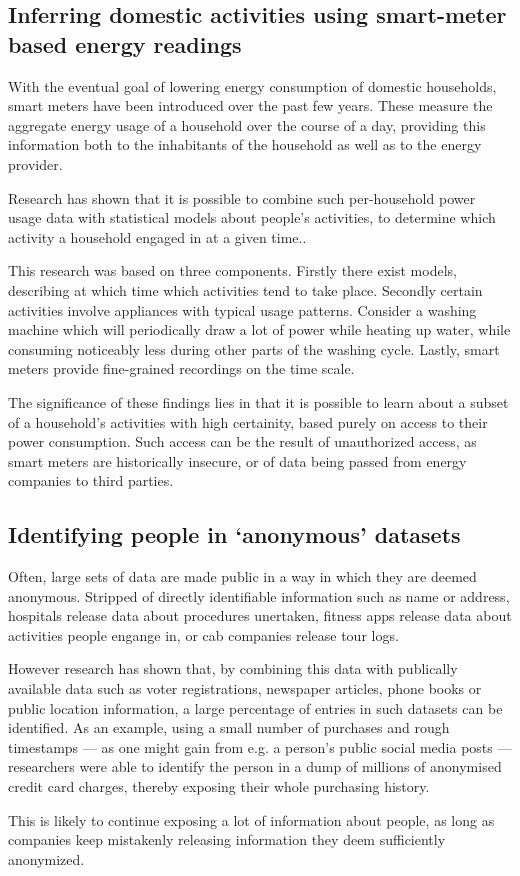 \documentclass[a4paper]{scrreprt}
\begin{document}
\subsection{Inferring domestic activities using smart-meter based energy readings}

With the eventual goal of lowering energy consumption of domestic households,
smart meters have been introduced over the past few years. These measure the
aggregate energy usage of a household over the course of a day, providing this
information both to the inhabitants of the household as well as to the energy
provider.

Research has shown that it is possible to combine such per-household power
usage data with statistical models about people's activities, to determine
which activity a household engaged in at a given
time.\autocite{stankovicMeasuringEnergyIntensity2016}.

This research was based on three components. Firstly there exist models,
describing at which time which activities tend to take place.  Secondly certain
activities involve appliances with typical usage patterns.  Consider a washing
machine which will periodically draw a lot of power while heating up water,
while consuming noticeably less during other parts of the washing cycle. Lastly,
smart meters provide fine-grained recordings on the time scale.

The significance of these findings lies in that it is possible to learn about a
subset of a household's activities with high certainity, based purely on access
to their power consumption. Such access can be the result of unauthorized
access, as smart meters are historically
insecure\autocite{starrYourSmartElectricity2017}, or of data being passed from
energy companies to third parties.

\subsection{Identifying people in `anonymous' datasets}

Often, large sets of data are made public in a way in which they are deemed
anonymous. Stripped of directly identifiable information such as name or
address, hospitals release data about procedures unertaken, fitness apps
release data about activities people engange in, or cab companies release tour
logs. \autocite{solonDataFingerprintWhy2018}

However research has shown that, by combining this data with publically
available data such as voter registrations, newspaper articles, phone books or
public location information, a large percentage of entries in such datasets can
be identified. As an example, using a small number of purchases and rough
timestamps --- as one might gain from e.g. a person's public social media posts
--- researchers were able to identify the person in a dump of millions of
anonymised credit card charges, thereby exposing their whole purchasing
history.  \autocite{demontjoyeUniqueShoppingMall2015}

This is likely to continue exposing a lot of information about people, as long
as companies keep mistakenly releasing information they deem sufficiently
anonymized.

\printbibliography
\end{document}
